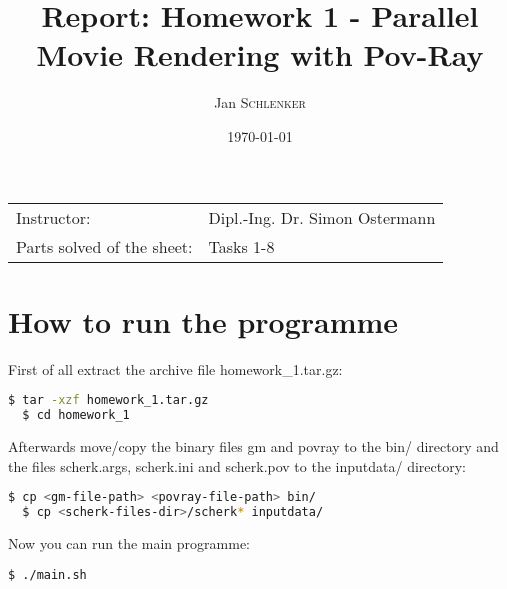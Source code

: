\documentclass{article}
\title{Report: Homework 1 - Parallel Movie Rendering with Pov-Ray}%
\author{Jan \textsc{Schlenker}} %
\date{\today} %
\begin{document}
\maketitle %

\begin{center}
\begin{tabular}{l l}
Instructor: & Dipl.-Ing. Dr. Simon Ostermann \\
Parts solved of the sheet: & Tasks 1-8 \\
\end{tabular}
\end{center}



\section{How to run the programme}

First of all extract the archive file homework\_1.tar.gz:

\begin{lstlisting}[language=bash, deletekeywords={cd}]
  $ tar -xzf homework_1.tar.gz
  $ cd homework_1
\end{lstlisting}

Afterwards move/copy the binary files gm and povray to the bin/ directory and the files scherk.args, scherk.ini and scherk.pov to the inputdata/ directory:

\begin{lstlisting}[language=bash]
  $ cp <gm-file-path> <povray-file-path> bin/
  $ cp <scherk-files-dir>/scherk* inputdata/
\end{lstlisting}

Now you can run the main programme:

\begin{lstlisting}[language=bash]
  $ ./main.sh
\end{lstlisting}

\end{document}
